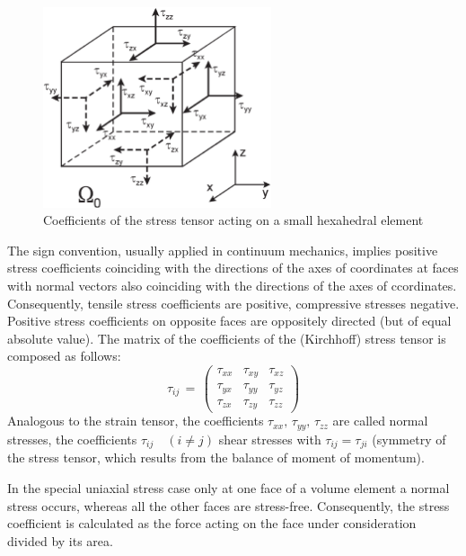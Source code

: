 \begin{figure}[htb!]
\begin{center}
\footnotesize
\includegraphics[width=0.6\textwidth]{figures/mech5.eps}
\caption{Coefficients of the stress tensor acting on a small hexahedral element \cite{Kol:02}}
\label{fig:stresstens_plane}
\end{center}
\end{figure}

The sign convention, usually applied in continuum mechanics, implies positive stress coefficients coinciding with the directions of the axes of coordinates at faces with normal vectors also coinciding with the directions of the axes of ccordinates. Consequently, tensile stress coefficients are positive, compressive stresses negative. Positive stress coefficients on opposite faces are oppositely directed (but of equal absolute value). The matrix of the coefficients of the (Kirchhoff) stress tensor is composed as follows:
\begin{equation}
\tau_{ij}\,=\,
\left(
\begin{array}{ccc}
\tau_{xx} & \tau_{xy} & \tau_{xz} \\
\tau_{yx} & \tau_{yy} & \tau_{yz} \\
\tau_{zx} & \tau_{zy} & \tau_{zz}
\end{array}
\right)
\label{eq:stress_matrix}
\end{equation}
Analogous to the strain tensor, the coefficients $\tau_{xx},\,\tau_{yy},\,\tau_{zz}$ are called normal stresses, the coefficients $\tau_{ij}\quad(i\neq j)$ shear stresses with $\tau_{ij}=\tau_{ji}$ (symmetry of the stress tensor, which results from the balance of moment of momentum).

In the special uniaxial stress case only at one face of a volume element a normal stress occurs, whereas all the other faces are stress-free. Consequently, the stress coefficient is calculated as the force acting on the face under consideration divided by its area.






